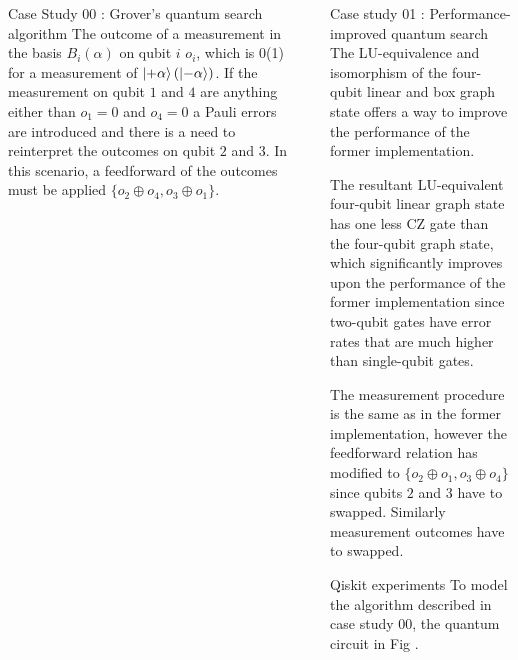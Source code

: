 \documentclass[final]{beamer}
\newlength{\sepwidth}
\newlength{\colwidth}
\newcommand{\separatorcolumn}{\begin{column}{\sepwidth}\end{column}}
\begin{document}
\begin{frame}[t]
\begin{columns}[t]
\begin{column}{\colwidth}
\begin{block}{Case Study 00 : Grover's quantum search algorithm}
                    The outcome of a measurement in the basis $B_i(\alpha)$ on
                    qubit $i$ $o_i$, which is 0(1) for a measurement of
                    $\ket{+\alpha}(\ket{-\alpha})$.  If the measurement on qubit
                    $1$ and $4$ are anything either than $o_1= 0$ and $o_4= 0$ a
                    Pauli errors are introduced and there is a need to
                    reinterpret the outcomes on qubit $2$ and $3$. In this
                    scenario, a feedforward  of the outcomes must be applied 
                    $\{o_2 \oplus o_4, o_3 \oplus o_ 1\}$.
                \end{block}
            \end{column}

            \separatorcolumn

            \begin{column}{\colwidth}
                \begin{block}{Case study 01 : Performance-improved quantum search}
                    The LU-equivalence and isomorphism of the four-qubit linear and box
                    graph state offers a way to improve the performance of the
                    former implementation.

                    The resultant LU-equivalent four-qubit
                    linear graph state has one less $\text{CZ}$ gate than the
                    four-qubit graph state, which significantly improves upon
                    the performance of the former implementation since two-qubit
                    gates have error rates that are much higher than
                    single-qubit gates.

                    The measurement procedure is the same as in the former
                    implementation, however the feedforward relation has
                    modified to $\{o_2 \oplus o_1, o_3 \oplus o_4 \}$ since
                    qubits $2$ and $3$ have to swapped. Similarly measurement outcomes have
                    to swapped.

                \end{block}
                \begin{block}{Qiskit experiments}
                    To model the algorithm described in case study 00, the
                    quantum circuit in Fig . 


\end{block}
\end{column}
\end{columns}
\end{frame}
\end{document}
